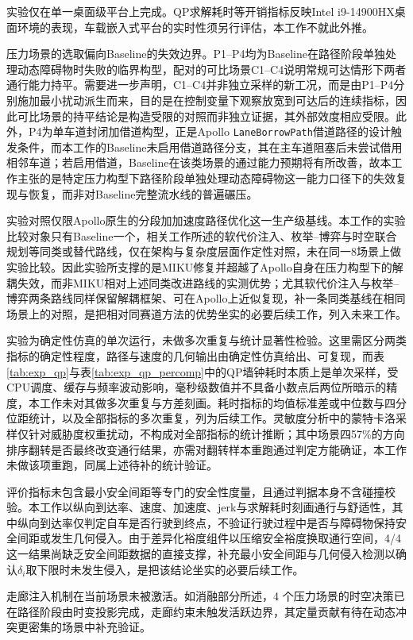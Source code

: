 \documentclass[a4paper,11pt]{ctexart}
\theoremstyle{definition}
\begin{document}
实验仅在单一桌面级平台上完成。QP求解耗时等开销指标反映Intel i9-14900HX桌面环境的表现，车载嵌入式平台的实时性须另行评估，本工作不就此外推。

压力场景的选取偏向Baseline的失效边界。P1--P4均为Baseline在路径阶段单独处理动态障碍物时失败的临界构型，配对的可比场景C1--C4说明常规可达情形下两者通行能力持平。需要进一步声明，C1--C4并非独立采样的新工况，而是由P1--P4分别施加最小扰动派生而来，目的是在控制变量下观察放宽到可达后的连续指标，因此可比场景的持平结论是构造受限的对照而非独立证据，其外部效度相应受限。此外，P4为单车道封闭加借道构型，正是Apollo \texttt{LaneBorrowPath}借道路径的设计触发条件，而本工作的Baseline未启用借道路径分支，其在主车道阻塞后未尝试借用相邻车道；若启用借道，Baseline在该类场景的通过能力预期将有所改善，故本工作主张的是特定压力构型下路径阶段单独处理动态障碍物这一能力口径下的失效复现与恢复，而非对Baseline完整流水线的普遍碾压。

实验对照仅限Apollo原生的分段加加速度路径优化这一生产级基线。本工作的实验比较对象只有Baseline一个，相关工作所述的软代价注入、枚举--博弈与时空联合规划等同类或替代路线，仅在架构与复杂度层面作定性对照，未在同一8场景上做实验比较。因此实验所支撑的是MIKU修复并超越了Apollo自身在压力构型下的解耦失效，而非MIKU相对上述同类改进路线的实测优势；尤其软代价注入与枚举--博弈两条路线同样保留解耦框架、可在Apollo上近似复现，补一条同类基线在相同场景上的对照，是把相对同赛道方法的优势坐实的必要后续工作，列入未来工作。

实验为确定性仿真的单次运行，未做多次重复与统计显著性检验。这里需区分两类指标的确定性程度，路径与速度的几何输出由确定性仿真给出、可复现，而表\ref{tab:exp_qp}与表\ref{tab:exp_qp_percomp}中的QP墙钟耗时本质上是单次采样，受CPU调度、缓存与频率波动影响，毫秒级数值并不具备小数点后两位所暗示的精度，本工作未对其做多次重复与方差刻画。耗时指标的均值标准差或中位数与四分位距统计，以及全部指标的多次重复，列为后续工作。灵敏度分析中的蒙特卡洛采样仅针对威胁度权重扰动，不构成对全部指标的统计推断；其中场景四57\%的方向排序翻转是否最终改变通行结果，亦需对翻转样本重跑通过判定方能确证，本工作未做该项重跑，同属上述待补的统计验证。

评价指标未包含最小安全间距等专门的安全性度量，且通过判据本身不含碰撞校验。本工作以纵向到达率、速度、加速度、jerk与求解耗时刻画通行与舒适性，其中纵向到达率仅判定自车是否行驶到终点，不验证行驶过程中是否与障碍物保持安全间距或发生几何侵入。由于差异化裕度组件以压缩安全裕度换取通行空间，4/4 这一结果尚缺乏安全间距数据的直接支撑，补充最小安全间距与几何侵入检测以确认$\delta_i$取下限时未发生侵入，是把该结论坐实的必要后续工作。

走廊注入机制在当前场景未被激活。如消融部分所述，4 个压力场景的时空决策已在路径阶段由时变投影完成，走廊约束未触发活跃边界，其定量贡献有待在动态冲突更密集的场景中补充验证。
\end{document}
